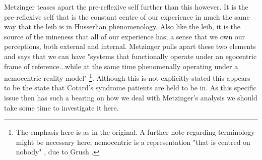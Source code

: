 Metzinger teases apart the pre-reflexive self further than this however. It is the pre-reflexive self that is the constant centre of our experience in much the same way that the leib is in Husserlian phenomenology. Also like the leib, it is the source of the mineness that all of our experience has; a sense that we own our perceptions, both external and internal. Metzinger pulls apart these two elements and says that we can have "systems that functionally operate under an egocentric frame of reference...while at the same time phenomenally operating under a nemocentric reality model" \cite[p. 336]{metzinger2003}\footnote{The emphasis here is as in the original. A further note regarding terminology might be necessary here, nemocentric is a representation "that is centred on nobody" \cite[p. 336 (footnote)]{metzinger2003}, due to Grush \cite{grush2000}.}. Although this is not explicitly stated this appears to be the state that Cotard's syndrome patients are held to be in. As this specific issue then has such a bearing on how we deal with Metzinger's analysis we should take some time to investigate it here.

